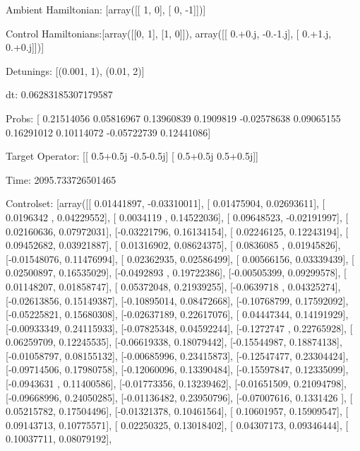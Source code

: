 \documentclass{article}
\begin{document}
    

\newpage

Ambient Hamiltonian: [array([[ 1,  0],
       [ 0, -1]])]

Control Hamiltonians:[array([[0, 1],
       [1, 0]]), array([[ 0.+0.j, -0.-1.j],
       [ 0.+1.j,  0.+0.j]])]

Detunings: [(0.001, 1), (0.01, 2)]

 dt: 0.06283185307179587

Probs: [ 0.21514056  0.05816967  0.13960839  0.1909819  -0.02578638  0.09065155
  0.16291012  0.10114072 -0.05722739  0.12441086]

Target Operator: [[ 0.5+0.5j -0.5-0.5j]
 [ 0.5+0.5j  0.5+0.5j]]

Time: 2095.733726501465

Controlset: [array([[ 0.01441897, -0.03310011],
       [ 0.01475904,  0.02693611],
       [ 0.0196342 ,  0.04229552],
       [ 0.0034119 ,  0.14522036],
       [ 0.09648523, -0.02191997],
       [ 0.02160636,  0.07972031],
       [-0.03221796,  0.16134154],
       [ 0.02246125,  0.12243194],
       [ 0.09452682,  0.03921887],
       [ 0.01316902,  0.08624375],
       [ 0.0836085 ,  0.01945826],
       [-0.01548076,  0.11476994],
       [ 0.02362935,  0.02586499],
       [ 0.00566156,  0.03339439],
       [ 0.02500897,  0.16535029],
       [-0.0492893 ,  0.19722386],
       [-0.00505399,  0.09299578],
       [ 0.01148207,  0.01858747],
       [ 0.05372048,  0.21939255],
       [-0.0639718 ,  0.04325274],
       [-0.02613856,  0.15149387],
       [-0.10895014,  0.08472668],
       [-0.10768799,  0.17592092],
       [-0.05225821,  0.15680308],
       [-0.02637189,  0.22617076],
       [ 0.04447344,  0.14191929],
       [-0.00933349,  0.24115933],
       [-0.07825348,  0.04592244],
       [-0.1272747 ,  0.22765928],
       [ 0.06259709,  0.12245535],
       [-0.06619338,  0.18079442],
       [-0.15544987,  0.18874138],
       [-0.01058797,  0.08155132],
       [-0.00685996,  0.23415873],
       [-0.12547477,  0.23304424],
       [-0.09714506,  0.17980758],
       [-0.12060096,  0.13390484],
       [-0.15597847,  0.12335099],
       [-0.0943631 ,  0.11400586],
       [-0.01773356,  0.13239462],
       [-0.01651509,  0.21094798],
       [-0.09668996,  0.24050285],
       [-0.01136482,  0.23950796],
       [-0.07007616,  0.1331426 ],
       [ 0.05215782,  0.17504496],
       [-0.01321378,  0.10461564],
       [ 0.10601957,  0.15909547],
       [ 0.09143713,  0.10775571],
       [ 0.02250325,  0.13018402],
       [ 0.04307173,  0.09346444],
       [ 0.10037711,  0.08079192],
\end{document}

